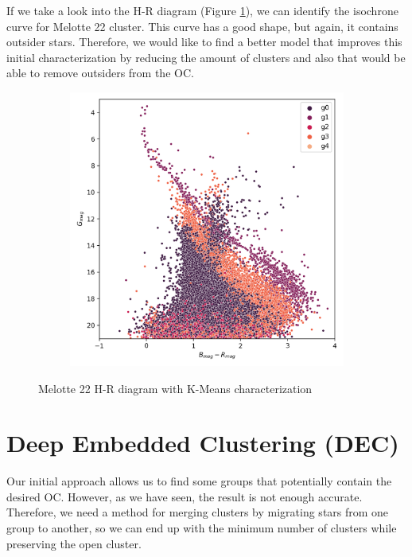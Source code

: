 \documentclass[11pt, a4paper, english]{book}
\begin{document}
If we take a look into the H-R diagram (Figure \ref{fig:kmeans_hr_diagram_melotte_22}), we can identify the isochrone curve for Melotte 22 cluster.
This curve has a good shape, but again, it contains outsider stars. Therefore, we would like to find a better model that improves this initial characterization
by reducing the amount of clusters and also that would be able to remove outsiders from the OC.

\begin{figure}[htbp]
  \centering
  \begin{subfigure}{0.5\textwidth}
    \centering
    \includegraphics[width=\textwidth]{../figures/melotte_22/kmeans_hr_diagram_melotte_22.png}
  \end{subfigure}
  \caption{Melotte 22 H-R diagram with K-Means characterization}
  \label{fig:kmeans_hr_diagram_melotte_22}
\end{figure}

\section{Deep Embedded Clustering (DEC)}

Our initial approach allows us to find some groups that potentially contain the desired OC. However, as we have seen, the result is not enough
accurate. Therefore, we need a method for merging clusters by migrating stars from one group to another,
so we can end up with the minimum number of clusters while preserving the open cluster.
\end{document}
